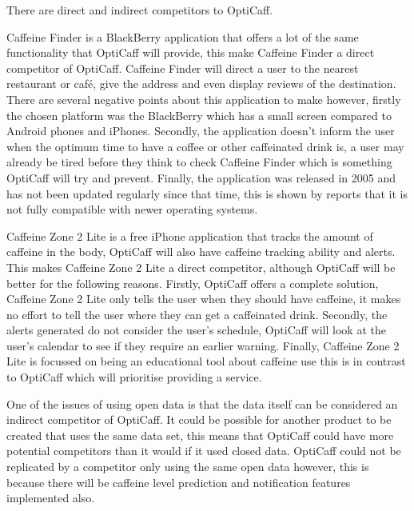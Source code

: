 There are direct and indirect competitors to OptiCaff.

Caffeine Finder is a BlackBerry application that offers a lot of the same functionality that OptiCaff will provide, this make Caffeine Finder a direct competitor of OptiCaff. Caffeine Finder will direct a user to the nearest restaurant or café, give the address and even display reviews of the destination. There are several negative points about this application to make however, firstly the chosen platform was the BlackBerry which has a small screen compared to Android phones and iPhones. Secondly, the application doesn’t inform the user when the optimum time to have a coffee or other caffeinated drink is, a user may already be tired before they think to check Caffeine Finder which is something OptiCaff will try and prevent. Finally, the application was released in 2005 and has not been updated regularly since that time, this is shown by reports that it is not fully compatible with newer operating systems.

Caffeine Zone 2 Lite is a free iPhone application that tracks the amount of caffeine in the body, OptiCaff will also have caffeine tracking ability and alerts. This makes Caffeine Zone 2 Lite a direct competitor, although OptiCaff will be better for the following reasons. Firstly, OptiCaff offers a complete solution, Caffeine Zone 2 Lite only tells the user when they should have caffeine, it makes no effort to tell the user where they can get a caffeinated drink. Secondly, the alerts generated do not consider the user’s schedule, OptiCaff will look at the user’s calendar to see if they require an earlier warning. Finally, Caffeine Zone 2 Lite is focussed on being an educational tool about caffeine use this is in contrast to OptiCaff which will prioritise providing a service.

One of the issues of using open data is that the data itself can be considered an indirect competitor of OptiCaff. It could be possible for another product to be created that uses the same data set, this means that OptiCaff could have more potential competitors than it would if it used closed data. OptiCaff could not be replicated by a competitor only using the same open data however, this is because there will be caffeine level prediction and notification features implemented also.

